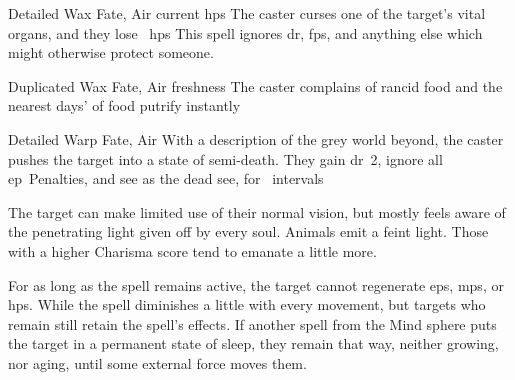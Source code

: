\ifodd\value{diceNo}
  {Detailed}%
  {Wax}%
  {Fate, Air}%
  {current \glspl{hp}}%
  {The caster curses one of the target's vital organs, and they lose \showDam~\glspl{hp}}%
  {This spell ignores \gls{dr}, \glspl{fp}, and anything else which might otherwise protect someone.}

\else

  {Duplicated}%
  {Wax}%
  {Fate, Air}%
  {freshness}%
  {The caster complains of rancid food and the nearest  days' of food putrify instantly}%
  {}

  {Detailed}%
  {Warp}%
  {Fate, Air}%
  {}%
  {With a description of the grey world beyond, the caster pushes the target into a state of semi-death.
  They gain \gls{dr}~2, ignore all \gls{ep}~Penalties, and see as the dead see, for ~\glspl{interval}}%
  {
    The target can make limited use of their normal vision, but mostly feels aware of the penetrating light given off by every soul.
    Animals emit a feint light.
    Those with a higher Charisma score tend to emanate a little more.

    For as long as the spell remains active, the target cannot regenerate \glspl{ep}, \glspl{mp}, or \glspl{hp}.
    While the spell diminishes a little with every movement, but targets who remain still retain the spell's effects.
    If another spell from the Mind sphere puts the target in a permanent state of sleep, they remain that way, neither growing, nor aging, until some external force moves them.
  }

\fi
{}
